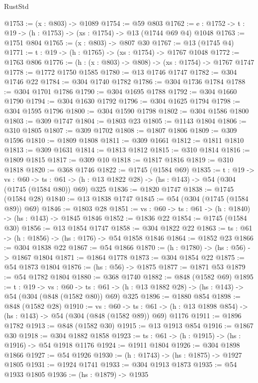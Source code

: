 \begin{lexlean}{RustStd}
\begin{coremodule}
@1753 := (x : @803) -> @1089
@1754 := @59 @803
@1762 := {e : @1752} -> {t : @19} -> (h : @1753) -> (xs : @1754) -> @13 (@1744 @69 @4) @1048
@1763 := @1751 @804
@1765 := (x : @803) -> @807 @30
@1767 := @13 (@1745 @4)
@1771 := {t : @19} -> (h : @1765) -> (xs : @1754) -> @1767 @1048
@1772 := @1763 @806
@1776 := (h : (x : @803) -> @808) -> (xs : @1754) -> @1767 @1747
@1778 := @1772 @1750 @1585
@1780 := @13 @1746 @1747
@1782 := @304 @1746 @22
@1784 := @304 @1740 @1782
@1786 := @304 @1736 @1784
@1788 := @304 @1701 @1786
@1790 := @304 @1695 @1788
@1792 := @304 @1660 @1790
@1794 := @304 @1630 @1792
@1796 := @304 @1625 @1794
@1798 := @304 @1595 @1796
@1800 := @304 @1590 @1798
@1802 := @304 @1586 @1800
@1803 := @309 @1747
@1804 := @1803 @23
@1805 := @1143 @1804
@1806 := @310 @1805
@1807 := @309 @1702
@1808 := @1807 @1806
@1809 := @309 @1596
@1810 := @1809 @1808
@1811 := @309 @1661
@1812 := @1811 @1810
@1813 := @309 @1631
@1814 := @1813 @1812
@1815 := @310 @1814
@1816 := @1809 @1815
@1817 := @309 @10
@1818 := @1817 @1816
@1819 := @310 @1818
@1820 := @368 @1746
@1822 := @1745 (@1584 @69)
@1835 := {t : @19} ->
  {vs : @60} ->
  {ts : @61} -> (h : @13 @1822 @28) -> (hs : @143) -> @54 (@304 (@1745 (@1584 @80)) @69) @325
@1836 := @1820 @1747
@1838 := @1745 (@1584 @28)
@1840 := @13 @1838 @1747
@1845 := @54 (@304 (@1745 (@1584 @89)) @69)
@1846 := @1803 @28
@1851 := {vs : @60} -> {ts : @61} -> (h : @1840) -> (hs : @143) -> @1845 @1846
@1852 := @1836 @22
@1854 := @1745 (@1584 @30)
@1856 := @13 @1854 @1747
@1858 := @304 @1822 @22
@1863 := {ts : @61} -> (h : @1856) -> (hs : @176) -> @54 @1858 @1846
@1864 := @1852 @23
@1866 := @304 @1838 @22
@1867 := @54 @1866
@1870 := (h : @1780) -> (hs : @56) -> @1867 @1804
@1871 := @1864 @1778
@1873 := @304 @1854 @22
@1875 := @54 @1873 @1804
@1876 := (hs : @56) -> @1875
@1877 := @1871 @53
@1879 := @54 @1782 @1804
@1880 := @368 @1740
@1882 := @848 (@1582 @69)
@1895 := {t : @19} ->
  {vs : @60} ->
  {ts : @61} -> (h : @13 @1882 @28) -> (hs : @143) -> @54 (@304 (@848 (@1582 @80)) @69) @325
@1896 := @1880 @854
@1898 := @848 (@1582 @28)
@1910 := {vs : @60} ->
  {ts : @61} -> (h : @13 @1898 @854) -> (hs : @143) -> @54 (@304 (@848 (@1582 @89)) @69) @1176
@1911 := @1896 @1782
@1913 := @848 (@1582 @30)
@1915 := @13 @1913 @854
@1916 := @1867 @30
@1918 := @304 @1882 @1858
@1923 := {ts : @61} -> (h : @1915) -> (hs : @1916) -> @54 @1918 @1176
@1924 := @1911 @1804
@1926 := @304 @1898 @1866
@1927 := @54 @1926
@1930 := (h : @1743) -> (hs : @1875) -> @1927 @1805
@1931 := @1924 @1741
@1933 := @304 @1913 @1873
@1935 := @54 @1933 @1805
@1936 := (hs : @1879) -> @1935

\end{coremodule}
\end{lexlean}
